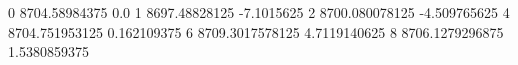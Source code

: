 0 8704.58984375 0.0
1 8697.48828125 -7.1015625
2 8700.080078125 -4.509765625
4 8704.751953125 0.162109375
6 8709.3017578125 4.7119140625
8 8706.1279296875 1.5380859375
